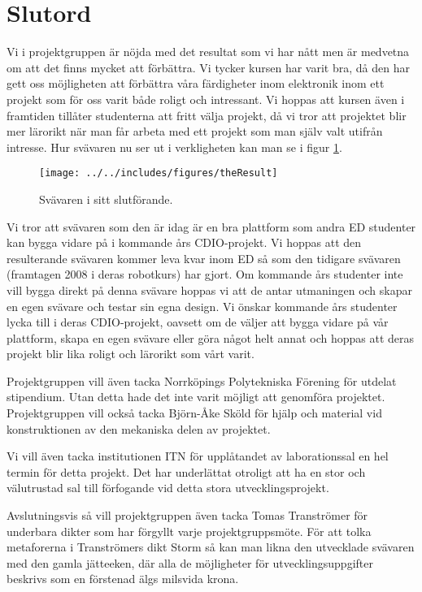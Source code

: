 \section{Slutord}
Vi i projektgruppen är nöjda med det resultat som vi har nått men är medvetna om
att det finns mycket att förbättra. Vi tycker kursen har varit bra, då den har
gett oss möjligheten att förbättra våra färdigheter inom elektronik inom ett
projekt som för oss varit både roligt och intressant. Vi hoppas att kursen även
i framtiden tillåter studenterna att fritt välja projekt, då vi tror att
projektet blir mer lärorikt när man får arbeta med ett projekt som man själv
valt utifrån intresse. Hur svävaren nu ser ut i verkligheten kan man se i figur
\ref{fig:theResult}.


\begin{figure}[htbp!]
\centering
\texttt{[image: ../../includes/figures/theResult]}
\caption{Svävaren i sitt slutförande.}
\label{fig:theResult}
\end{figure}


Vi tror att svävaren som den är idag är en bra plattform som andra ED studenter
kan bygga vidare på i kommande års CDIO-projekt. Vi hoppas att den resulterande
svävaren kommer leva kvar inom ED så som den tidigare svävaren (framtagen 2008 i
deras robotkurs) har gjort. Om kommande års studenter inte vill bygga direkt på
denna svävare hoppas vi att de antar utmaningen och skapar en egen svävare och
testar sin egna design. Vi önskar kommande års studenter lycka till i deras
CDIO-projekt, oavsett om de väljer att bygga vidare på vår plattform, skapa en
egen svävare eller göra något helt annat och hoppas att deras projekt blir lika
roligt och lärorikt som vårt varit.

Projektgruppen vill även tacka Norrköpings Polytekniska Förening för utdelat
stipendium. Utan detta hade det inte varit möjligt att genomföra projektet.
Projektgruppen vill också tacka Björn-Åke Sköld för hjälp och material vid
konstruktionen av den mekaniska delen av projektet.

Vi vill även tacka institutionen ITN för upplåtandet av laborationssal en hel
termin för detta projekt. Det har underlättat otroligt att ha en stor och
välutrustad sal till förfogande vid detta stora utvecklingsprojekt.

Avslutningsvis så vill projektgruppen även tacka Tomas Tranströmer för underbara
dikter som har förgyllt varje projektgruppsmöte. För att tolka metaforerna i
Tranströmers dikt Storm så kan man likna den utvecklade svävaren med den gamla
jätteeken, där alla de möjligheter för utvecklingsuppgifter beskrivs som en
förstenad älgs milsvida krona.
